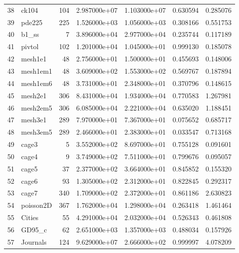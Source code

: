 \begin{tabular}{llrrrrr}
38 &               ck104 &   104 &  2.987000e+07 &  1.103000e+07 &  0.630594 &   0.285076 \\
39 &              pde225 &   225 &  1.526000e+03 &  1.056000e+03 &  0.308166 &   0.551753 \\
40 &               b1\_ss &     7 &  3.896000e+04 &  2.977000e+04 &  0.235744 &   0.117189 \\
41 &              pivtol &   102 &  1.201000e+04 &  1.045000e+01 &  0.999130 &   0.185078 \\
42 &             mesh1e1 &    48 &  2.756000e+01 &  1.500000e+01 &  0.455693 &   0.148006 \\
43 &            mesh1em1 &    48 &  3.609000e+02 &  1.553000e+02 &  0.569767 &   0.187894 \\
44 &            mesh1em6 &    48 &  3.731000e+01 &  2.348000e+01 &  0.370796 &   0.148615 \\
45 &             mesh2e1 &   306 &  8.431000e+04 &  1.934000e+04 &  0.770583 &   1.267981 \\
46 &            mesh2em5 &   306 &  6.085000e+04 &  2.221000e+04 &  0.635020 &   1.188451 \\
47 &             mesh3e1 &   289 &  7.970000e+01 &  7.367000e+01 &  0.075652 &   0.685717 \\
48 &            mesh3em5 &   289 &  2.466000e+01 &  2.383000e+01 &  0.033547 &   0.713168 \\
49 &               cage3 &     5 &  3.552000e+02 &  8.697000e+01 &  0.755128 &   0.091601 \\
50 &               cage4 &     9 &  3.749000e+02 &  7.511000e+01 &  0.799676 &   0.095057 \\
51 &               cage5 &    37 &  2.377000e+02 &  3.664000e+01 &  0.845852 &   0.155320 \\
52 &               cage6 &    93 &  1.305000e+02 &  2.312000e+01 &  0.822845 &   0.292317 \\
53 &               cage7 &   340 &  1.709000e+02 &  2.372000e+01 &  0.861186 &   2.630823 \\
54 &           poisson2D &   367 &  1.762000e+04 &  1.298000e+04 &  0.263418 &   1.461464 \\
55 &              Cities &    55 &  4.291000e+04 &  2.032000e+04 &  0.526343 &   0.461808 \\
56 &              GD95\_c &    62 &  2.651000e+03 &  1.357000e+03 &  0.488034 &   0.157926 \\
57 &            Journals &   124 &  9.629000e+07 &  2.666000e+02 &  0.999997 &   4.078209 \\

\end{tabular}
